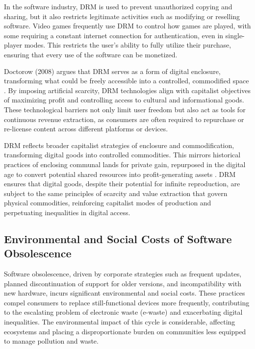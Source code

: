 \begin{refsection}
In the software industry, DRM is used to prevent unauthorized copying and sharing, but it also restricts legitimate activities such as modifying or reselling software. Video games frequently use DRM to control how games are played, with some requiring a constant internet connection for authentication, even in single-player modes. This restricts the user's ability to fully utilize their purchase, ensuring that every use of the software can be monetized.

Doctorow (2008) argues that DRM serves as a form of digital enclosure, transforming what could be freely accessible into a controlled, commodified space \cite[pp.~20]{doctorow2008content}. By imposing artificial scarcity, DRM technologies align with capitalist objectives of maximizing profit and controlling access to cultural and informational goods. These technological barriers not only limit user freedom but also act as tools for continuous revenue extraction, as consumers are often required to repurchase or re-license content across different platforms or devices.

DRM reflects broader capitalist strategies of enclosure and commodification, transforming digital goods into controlled commodities. This mirrors historical practices of enclosing communal lands for private gain, repurposed in the digital age to convert potential shared resources into profit-generating assets \cite[pp.~33]{harvey2010new}. DRM ensures that digital goods, despite their potential for infinite reproduction, are subject to the same principles of scarcity and value extraction that govern physical commodities, reinforcing capitalist modes of production and perpetuating inequalities in digital access.

\subsection{Environmental and Social Costs of Software Obsolescence}

Software obsolescence, driven by corporate strategies such as frequent updates, planned discontinuation of support for older versions, and incompatibility with new hardware, incurs significant environmental and social costs. These practices compel consumers to replace still-functional devices more frequently, contributing to the escalating problem of electronic waste (e-waste) and exacerbating digital inequalities. The environmental impact of this cycle is considerable, affecting ecosystems and placing a disproportionate burden on communities less equipped to manage pollution and waste.


\end{refsection}
